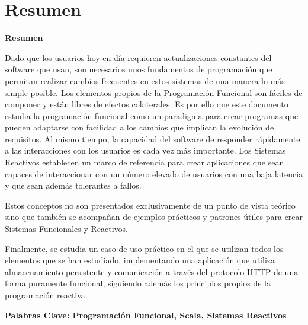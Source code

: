 \documentclass[../main.tex]{subfiles}
\begin{document}
\makeatletter
\renewenvironment{abstract}{%
    \if@twocolumn
      \section*{Resumen \\}%
    \else %
    \begin{flushright}
        {\filleft\Huge\bfseries\fontsize{48pt}{12}\selectfont Resumen\vspace{\z@}}%
        \end{flushright}
      \quotation
    \fi}
    {\if@twocolumn\else\endquotation\fi}
\makeatother
\begin{abstract}
Dado que los usuarios hoy en día requieren actualizaciones constantes del software que usan, 
son necesarios unos fundamentos de programación que permitan realizar cambios frecuentes 
en estos sistemas de una manera lo más simple posible. Los elementos propios de la Programación Funcional 
son fáciles de componer y están libres de efectos colaterales. Es por ello que este documento 
estudia la programación funcional como un paradigma para crear programas que pueden adaptarse 
con facilidad a los cambios que implican la evolución de requisitos. Al mismo tiempo, 
la capacidad del software de responder rápidamente a las interacciones con los usuarios 
es cada vez más importante. Los Sistemas Reactivos establecen un marco de referencia 
para crear aplicaciones que sean capaces de interaccionar con un número elevado de usuarios
con una baja latencia y que sean además tolerantes a fallos.

Estos conceptos no son presentados exclusivamente de un punto de vista teórico sino 
que también se acompañan de ejemplos prácticos y patrones útiles para crear Sistemas 
Funcionales y Reactivos.

Finalmente, se estudia un caso de uso práctico en el que se utilizan todos los elementos 
que se han estudiado, implementando una aplicación que utiliza almacenamiento persistente 
y comunicación a través del protocolo HTTP de una forma puramente funcional, siguiendo además
los principios propios de la programación reactiva.

\bfseries{\large{Palabras Clave:} Programación Funcional, Scala, Sistemas Reactivos}

\end{abstract}
\end{document}
